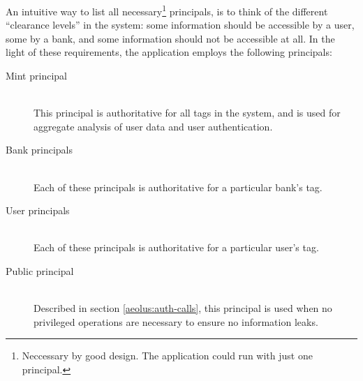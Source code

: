 An intuitive way to list all necessary\footnote{Neccessary by good design. The application could run with just one principal.} principals, is to think of the different ``clearance levels'' in the system: some information should be accessible by a user, some by a bank, and some information should not be accessible at all. In the light of these requirements, the application employs the following principals:
\begin{description}
  \item[Mint principal] \ \\
    This principal is authoritative for all tags in the system, and is
    used for aggregate analysis of user data and
    user authentication.
  \item[Bank principals] \ \\
    Each of these principals is authoritative for a particular bank's tag.
  \item[User principals] \ \\
    Each of these principals is authoritative for a particular user's tag.
  \item[Public principal] \ \\
    Described in section \ref{aeolus:auth-calls}, this
    principal is used when no privileged operations are 
    necessary to ensure no information leaks.
\end{description}


